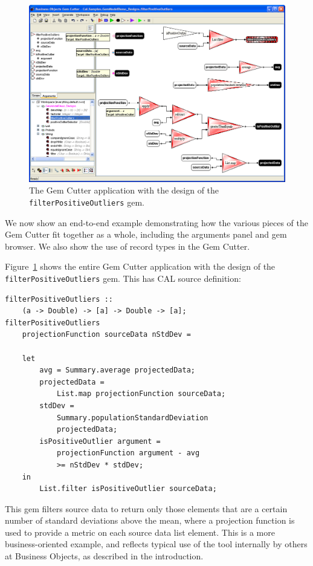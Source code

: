 \documentclass[preprint]{sigplanconf}
\begin{document}
\begin{figure}[bt!]
  \centering
  \includegraphics[width=42pc]{filterPositiveOutliers.png}
  \caption{The Gem Cutter application with the design of the {\tt filterPositiveOutliers} gem.}
  \label{fig:filterPositiveOutliers}
\end{figure}

We now show an end-to-end example demonstrating how the various pieces
of the Gem Cutter fit together as a whole, including the arguments
panel and gem browser. We also show the use of record types in the Gem
Cutter.

Figure~\ref{fig:filterPositiveOutliers} shows the entire Gem Cutter
application with the design of the {\tt filterPositiveOutliers}
gem. This has CAL source definition:

\begin{verbatim}
filterPositiveOutliers ::
    (a -> Double) -> [a] -> Double -> [a];
filterPositiveOutliers
    projectionFunction sourceData nStdDev = 
    
    let
        avg = Summary.average projectedData;
        projectedData =
            List.map projectionFunction sourceData;
        stdDev =
            Summary.populationStandardDeviation
            projectedData;
        isPositiveOutlier argument =
            projectionFunction argument - avg
            >= nStdDev * stdDev;
    in
        List.filter isPositiveOutlier sourceData;
\end{verbatim}

This gem filters source data to return only those elements that are a
certain number of standard deviations above the mean, where a
projection function is used to provide a metric on each source data
list element. This is a more business-oriented example, and reflects
typical use of the tool internally by others at
Business Objects, as described in the introduction.
\end{document}
